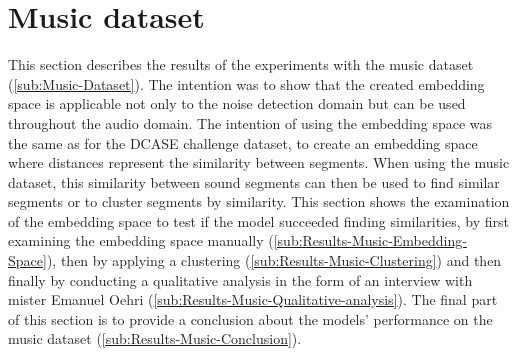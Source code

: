 \section{Music dataset}
\label{sec:Results-Music}
This section describes the results of the experiments with the music dataset (\ref{sub:Music-Dataset}). The intention was to show that the created embedding space is applicable not only to the noise detection domain but can be used throughout the audio domain. The intention of using the embedding space was the same as for the \gls{DCASE} challenge dataset, to create an embedding space where distances represent the similarity between segments. When using the music dataset, this similarity between sound segments can then be used to find similar segments or to cluster segments by similarity. This section shows the examination of the embedding space to test if the model succeeded finding similarities, by first examining the embedding space manually (\ref{sub:Results-Music-Embedding-Space}), then by applying a clustering (\ref{sub:Results-Music-Clustering}) and then finally by conducting a qualitative analysis in the form of an interview with mister Emanuel Oehri (\ref{sub:Results-Music-Qualitative-analysis}). The final part of this section is to provide a conclusion about the models' performance on the music dataset (\ref{sub:Results-Music-Conclusion}).

